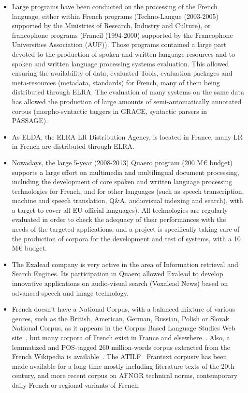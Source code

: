 \begin{multicols}{2}
\begin{itemize}
\item Large programs have been conducted on the processing of the French
language, either within French programs (Techno-Langue (2003-2005)
supported by the Ministries of Research, Industry and Culture), or
francophone programs (Francil (1994-2000) supported by the Francophone
Universities Association (AUF)). Those programs contained a large part
devoted to the production of spoken and written language resources and
to spoken and written language processing systems evaluation. This
allowed ensuring the availability of data, evaluated Tools, evaluation
packages and meta-resources (metadata, standards) for French, many of
them being distributed through ELRA. The evaluation of many systems on
the same data has allowed the production of large amounts of
semi-automatically annotated corpus (morpho-syntactic taggers in GRACE,
syntactic parsers in PASSAGE).

\item As ELDA, the ELRA LR Distribution Agency, is located in France, many
LR in French are distributed through ELRA.

\item Nowadays, the large 5-year (2008-2013) Quaero program (200 M€
  budget) supports a large effort on multimedia and multilingual
  document processing, including the development of core spoken and
  written language processing technologies for French, and for other
  languages (such as speech transcription, machine and speech
  translation, Q\&A, audiovisual indexing and search), with a target
  to cover all EU official languages). All technologies are regularly
  evaluated in order to check the adequacy of their performances with
  the needs of the targeted applications, and a project is
  specifically taking care of the production of corpora for the
  development and test of systems, with a 10 M€ budget.

\item The Exalead company is very active in the area of Information
retrieval and Search Engines. Its participation in Quaero allowed
Exalead to develop innovative applications on audio-visual search
(Voxalead News) based on advanced speech and image technology.

\item French doesn’t have a National Corpus, with a balanced mixture of
various genres, such as the British, American, German, Russian, Polish
or Slovak National Corpus, as it appears in the Corpus Based Language
Studies Web site~\cite{corpuslangstud}, but many corpora of French exist in France and
elsewhere~\cite{corpusfr}. Also, a lemmatized and POS-tagged 260 million-words
corpus extracted from the French Wikipedia is available~\cite{wikipediafr}. The ATILF~\cite{atilf}
Frantext corpusiv has been made available for a long time mostly
including literature texts of the 20th century, and more recent corpus
on AFNOR technical norms, contemporary daily French or regional
variants of French.


\end{itemize}
\end{multicols}
